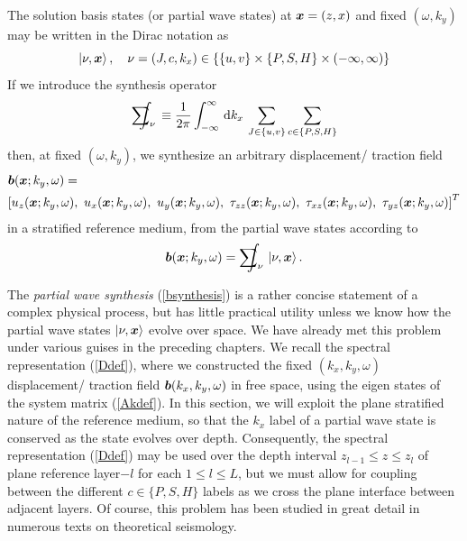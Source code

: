  The solution basis states (or partial wave 
states) at ${\mbox{\boldmath$\mit x$\unboldmath}}=(z,x)$ and fixed $(\omega, k_y)$ may be written in the Dirac notation as
\[
\left|\nu, {\mbox{\boldmath$\mit x$\unboldmath}}  \right\rangle, \quad \nu=(J,c,k_x)\in \{ \{u,v  \} \times \{ 
P, S, H \} 
\times (-\infty, \infty)   \}
\]
If we introduce the synthesis operator
\[
\sum\nolimits_\nu\!\!\!\!\!\!\!\!\! \int\,\,\, \equiv {\frac{1}{2 \pi }}\int_{- \infty }^{ \infty }\, {\rm d}{k}_{x}\, 
\sum\limits_{ J  \in   \left\{{u,v}\right\}} 
\sum\limits_{ c  \in   \left\{{P,S,H}\right\}}
\]
then, at fixed $(\omega, k_y)$, we synthesize an 
arbitrary displacement/ traction field 
\begin{eqnarray} \label{bdefSurf}
\lefteqn{{\bmi b}({\bmi x};k_y,\omega)=}\\
&&\!\!\!\!\!\!
\left[u_{z}({\bmi x};k_y,\omega),\ u_{x}({\bmi x};k_y,\omega),\ u_{y}({\bmi x};k_y,\omega), 
\ \tau_{zz}({\bmi x};k_y,\omega),\  \tau_{xz}({\bmi x};k_y,\omega),\ 
\tau_{yz}({\bmi x};k_y,\omega) \right]^{T}\nonumber
\end{eqnarray}
in a stratified reference medium, from the partial 
wave states according to
\begin{equation} \label{bsynthesis}
{\bmi b}({\bmi x};k_y,\omega)=
\sum\nolimits_\nu\!\!\!\!\!\!\!\!\! \int \,\,\, \left|\nu, {\bmi x}  
\right\rangle.
\end{equation}
 
The {\em partial wave synthesis\/} (\ref{bsynthesis}) is a rather concise statement of a 
complex physical process, but has little practical utility unless we know 
how the partial wave states $\left|\nu, {\mbox{\boldmath$\mit x$\unboldmath}}  
\right\rangle$ evolve over space. We have already met this problem under 
various guises in the preceding chapters. We recall the spectral 
representation (\ref{Ddef}), where we constructed the fixed 
$(k_x,k_y,\omega)$ displacement/ traction field
${\mbox{\boldmath$\mit b$\unboldmath}}(k_x,k_y,\omega)$ in free space, using the eigen states of the system 
matrix (\ref{Akdef}). In this section, we will exploit the plane 
stratified nature of the reference medium, so that the $k_x$ label
of a partial wave state  is conserved as the state evolves over depth.
Consequently, the spectral 
representation (\ref{Ddef}) may be used over the depth interval $z_{l-1} \le z \le 
z_{l}$  of plane reference layer$-l$ for each $1 \le l \le L$, but we 
must allow for coupling between the different $c\in \{P, S, H\}$ labels 
as we cross the plane interface between adjacent layers. Of course, this 
problem has been studied in great detail in numerous texts on 
theoretical seismology.  



